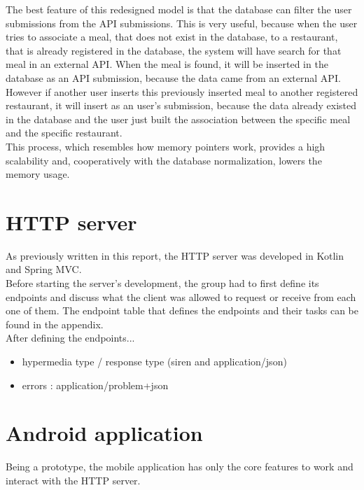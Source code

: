 The best feature of this redesigned model is that the database can filter the user submissions from the API submissions. This is very
useful, because when the user tries to associate a meal, that does not exist in the database, to a restaurant, that is already registered
in the database, the system will have search for that meal in an external API. When the meal is found, it will be inserted in the database
as an API submission, because the data came from an external API.\\

However if another user inserts this previously inserted meal to another registered restaurant, it will insert as an user's submission, because
the data already existed in the database and the user just built the association between the specific meal and the specific restaurant.\\

This process, which resembles how memory pointers work, provides a high scalability and, cooperatively with the database normalization, lowers the memory usage.

\section{HTTP server}

As previously written in this report, the HTTP server was developed in Kotlin and Spring MVC.\\

Before starting the server's development, the group had to first define its endpoints and discuss what the client was allowed to request or receive from each one of them.
The endpoint table that defines the endpoints and their tasks can be found in the appendix.\\

After defining the endpoints...


\begin{itemize}
    \item hypermedia type / response type (siren and application/json)
    \item errors : application/problem+json
\end{itemize}

\section{Android application}

Being a prototype, the mobile application has only the core features to work and interact with the HTTP server.

